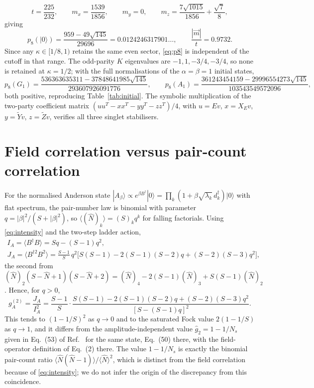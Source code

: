 \documentclass[11pt,a4paper]{article}
\newcommand{\ket}[1]{|#1\rangle}
\newcommand{\Zt}{\widetilde Z}
\newcommand{\Yt}{\widetilde Y}
\begin{document}
\begin{equation}
t=\frac{225}{232},\qquad m_x=\frac{1539}{1856},\qquad m_y=0,\qquad m_z=\frac{7\sqrt{1015}}{1856}+\frac{\sqrt7}{8},
\end{equation}
giving
\begin{equation}
p_8(\ket0)=\frac{959-49\sqrt{145}}{29696}=0.0124246317901\ldots,\qquad \frac{|\vec m|}{t}=0.9732 .
\label{eq:p8}
\end{equation}
Since any $\kappa\in[1/8,1)$ retains the same even sector, \eqref{eq:p8} is independent of the cutoff in that range. The odd-parity $K$ eigenvalues are $-1,1,-3/4,-3/4$, so none is retained at $\kappa=1/2$; with the full normalisations of the $\alpha=\beta=1$ initial states,
\begin{equation}
p_8(G_1)=\frac{536363635311-37848641985\sqrt{145}}{293607926091776},\qquad
p_8(A_1)=\frac{361243454159-29996554273\sqrt{145}}{103543549572096},
\end{equation}
both positive, reproducing Table~\ref{tab:initial}. The symbolic multiplication of the two-party coefficient matrix $(uu^T-xx^T-yy^T-zz^T)/4$, with $u=Ev$, $x=X_Ev$, $y=\Yt v$, $z=\Zt v$, verifies all three singlet stabilisers.

\section{Field correlation versus pair-count correlation}
\label{app:g2}

For the normalised Anderson state $\ket{A_\beta}\propto e^{\beta B^\dagger}\ket0=\prod_k(1+\beta\sqrt{\lambda_k}\,d_k^\dagger)\ket0$ with flat spectrum, the pair-number law is binomial with parameter $q=|\beta|^2/(S+|\beta|^2)$, so $\langle(\hat N)_k\rangle=(S)_kq^k$ for falling factorials. Using \eqref{eq:intensity} and the two-step ladder action,
\begin{equation}
\begin{gathered}
I_A=\langle B^\dagger B\rangle=Sq-(S-1)q^2,\\
J_A=\langle B^{\dagger2}B^2\rangle=\frac{S-1}{S}\,q^2\big[S(S-1)-2(S-1)(S-2)q+(S-2)(S-3)q^2\big],
\end{gathered}
\end{equation}
the second from $(\hat N)_2(S-\hat N+1)(S-\hat N+2)=(\hat N)_4-2(S-1)(\hat N)_3+S(S-1)(\hat N)_2$. Hence, for $q>0$,
\begin{equation}
g^{(2)}_A=\frac{J_A}{I_A^2}=\frac{S-1}{S}\cdot\frac{S(S-1)-2(S-1)(S-2)q+(S-2)(S-3)q^2}{[S-(S-1)q]^2}.
\label{eq:g2A}
\end{equation}
This tends to $(1-1/S)^2$ as $q\to0$ and to the saturated Fock value $2(1-1/S)$ as $q\to1$, and it differs from the amplitude-independent value $\hat g_2=1-1/N_s$ given in Eq.~(53) of Ref.~\cite{Shiau2017} for the same state, Eq.~(50) there, with the field-operator definition of Eq.~(2) there. The value $1-1/N_s$ is exactly the binomial pair-count ratio $\langle\hat N(\hat N-1)\rangle/\langle\hat N\rangle^2$, which is distinct from the field correlation because of \eqref{eq:intensity}; we do not infer the origin of the discrepancy from this coincidence.
\end{document}
